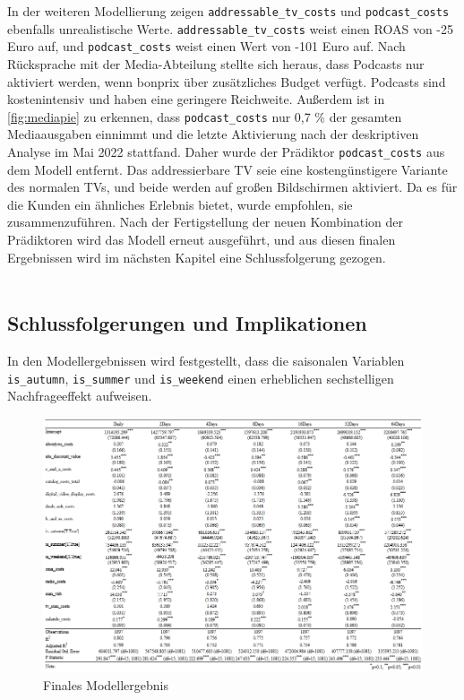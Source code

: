 In der weiteren Modellierung zeigen \verb|addressable_tv_costs| und \verb|podcast_costs| ebenfalls unrealistische Werte. \verb|addressable_tv_costs| weist einen \ac{ROAS} von -25 Euro auf, und \verb|podcast_costs| weist einen Wert von -101 Euro auf. Nach Rücksprache mit der Media-Abteilung stellte sich heraus, dass Podcasts nur aktiviert werden, wenn bonprix über zusätzliches Budget verfügt. Podcasts sind kostenintensiv und haben eine geringere Reichweite. Außerdem ist in \autoref{fig:mediapie} zu erkennen, dass \verb|podcast_costs| nur 0,7 \% der gesamten Mediaausgaben einnimmt und die letzte Aktivierung nach der deskriptiven Analyse im Mai 2022 stattfand. Daher wurde der Prädiktor \verb|podcast_costs| aus dem Modell entfernt. Das addressierbare TV seie eine kostengünstigere Variante des normalen TVs, und beide werden auf großen Bildschirmen aktiviert. Da es für die Kunden ein ähnliches Erlebnis bietet, wurde empfohlen, sie zusammenzuführen. Nach der Fertigstellung der neuen Kombination der Prädiktoren wird das Modell erneut ausgeführt, und aus diesen finalen Ergebnissen wird im nächsten Kapitel eine Schlussfolgerung gezogen. \\\\
\subsection{Schlussfolgerungen und Implikationen}
\label{schlussfolgerungenUndImplikationen}
In den Modellergebnissen wird festgestellt, dass die saisonalen Variablen \verb|is_autumn|, \verb|is_summer| und \verb|is_weekend| einen erheblichen sechstelligen Nachfrageeffekt aufweisen. 
\begin{figure}[H]
    \centering
    \includegraphics[width=1\linewidth]{images/finalols.png}
    \caption{Finales Modellergebnis}
    \label{fig:finalmodell}
\end{figure}